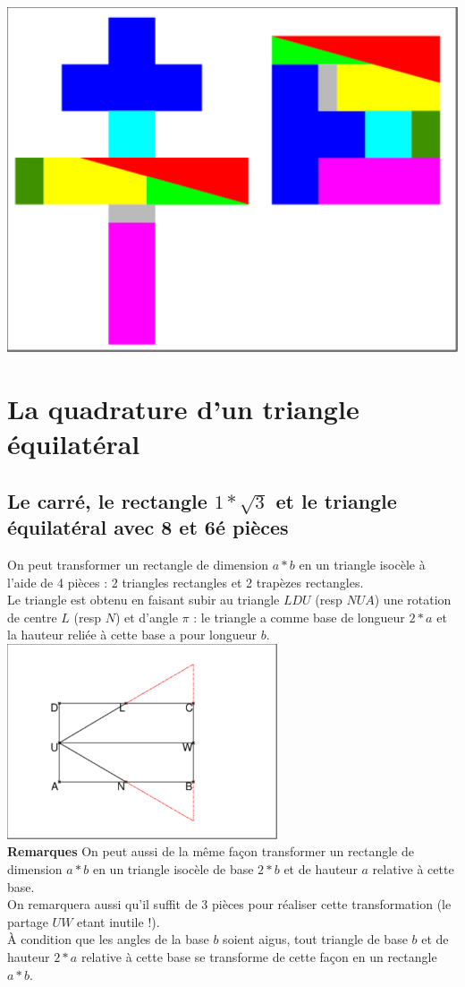 \documentclass[a4paper,11pt]{book}
\begin{document}
\includegraphics[width=\textwidth]{puzzlecroix15}\\

\section{La quadrature d'un triangle \'equilat\'eral}
\subsection{Le carr\'e, le rectangle $1*\sqrt3$ et le triangle \'equilat\'eral avec 8 et 6é pi\`eces}
On peut transformer un rectangle de dimension $a*b$ en un triangle isoc\`ele 
\`a l'aide de 4 pi\`eces : 2 triangles rectangles et 2 trap\`ezes rectangles.\\
Le triangle est obtenu en faisant subir au triangle $LDU$ (resp $NUA$) une 
rotation de centre $L$ (resp $N$) et d'angle $\pi$ : le triangle a comme base 
de longueur $2*a$ et la hauteur reli\'ee \`a cette base a pour longueur $b$.\\
\includegraphics[width=8cm]{puzzleca0}\\
{\bf Remarques}
On peut aussi de la m\^eme fa\c{c}on transformer un rectangle de dimension 
$a*b$ en un triangle isoc\`ele de base $2*b$ et de hauteur $a$ relative \`a 
cette base.\\
On remarquera aussi qu'il suffit de 3 pi\`eces pour r\'ealiser cette 
transformation (le partage $UW$ etant inutile !).\\
\`A condition que les angles de la base $b$ soient aigus, tout triangle de base
$b$ et de hauteur $2*a$ relative \`a cette base se transforme de cette fa\c{c}on
en un rectangle $a*b$.
\end{document}
